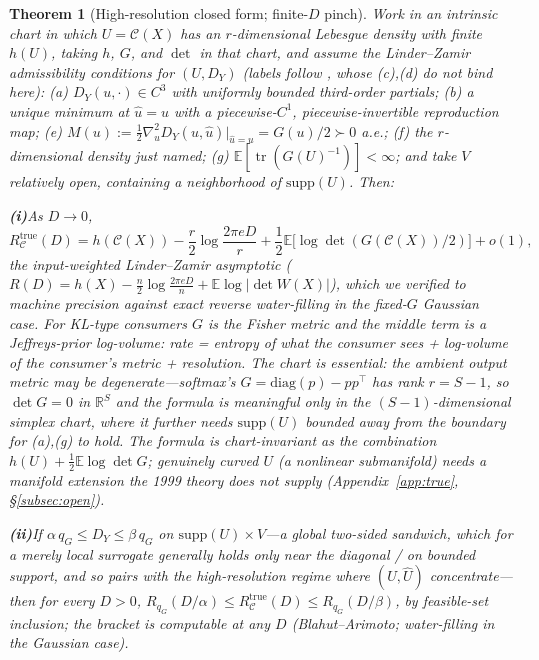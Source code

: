 \documentclass[lettersize,onecolumn]{IEEEtran}
\newtheorem{theorem}{Theorem}
\theoremstyle{definition}
\theoremstyle{remark}
\newcommand{\tr}{\operatorname{tr}}
\newcommand{\E}{\mathbb{E}}
\begin{document}
\begin{theorem}[High-resolution closed form; finite-$D$ pinch]\label{thm:B3}
Work in an intrinsic chart in which $U=\mathcal{C}(X)$ has an $r$-dimensional Lebesgue
density with finite $h(U)$, taking $h$, $G$, and $\det$ in that chart, and assume the
Linder--Zamir admissibility conditions \cite{linderzamir1999} for $(U,D_Y)$ (labels follow \cite{linderzamir1999}, whose (c),(d) do not bind here): \emph{(a)}
$D_Y(u,\cdot)\in C^3$ with uniformly bounded third-order partials; \emph{(b)} a unique
minimum at $\hat u=u$ with a piecewise-$C^1$, piecewise-invertible reproduction map;
\emph{(e)} $M(u):=\tfrac12\nabla^2_{\hat u}D_Y(u,\hat u)|_{\hat u=u}=G(u)/2\succ0$ a.e.;
\emph{(f)} the $r$-dimensional density just named; \emph{(g)}
$\E[\tr(G(U)^{-1})]<\infty$; and take $V$ relatively open, containing a neighborhood of
$\mathrm{supp}(U)$. Then:

\smallskip\noindent\textbf{(i)}\;As $D\to0$,
\[
R_{\mathcal{C}}^{\mathrm{true}}(D)=h(\mathcal{C}(X))-\frac r2\log\frac{2\pi eD}{r}
+\frac12\E\bigl[\log\det(G(\mathcal{C}(X))/2)\bigr]+o(1),
\]
the input-weighted Linder--Zamir asymptotic ($R(D)=h(X)-\tfrac n2\log\tfrac{2\pi
eD}{n}+\E\log|\det W(X)|$), which we verified to machine precision against exact reverse
water-filling in the fixed-$G$ Gaussian case. For KL-type consumers $G$ is the Fisher
metric and the middle term is a Jeffreys-prior log-volume: \emph{rate = entropy of
what the consumer sees + log-volume of the consumer's metric + resolution}. The
chart is essential: the ambient output metric may be degenerate---softmax's
$G=\mathrm{diag}(p)-pp^\top$ has rank $r=S-1$, so $\det G=0$ in $\mathbb{R}^S$ and the
formula is meaningful only in the $(S-1)$-dimensional simplex chart, where it further
needs $\mathrm{supp}(U)$ bounded away from the boundary for (a),(g) to hold. The formula
is chart-invariant as the combination $h(U)+\tfrac12\E\log\det G$; genuinely
\emph{curved} $U$ (a nonlinear submanifold) needs a manifold extension the 1999 theory
does not supply (Appendix~\ref{app:true}, \S\ref{subsec:open}).

\smallskip\noindent\textbf{(ii)}\;If $\alpha\,q_G\le D_Y\le\beta\,q_G$ on
$\mathrm{supp}(U)\times V$---a \emph{global} two-sided sandwich, which for a merely
local surrogate generally holds only near the diagonal / on bounded support, and so
pairs with the high-resolution regime where $(U,\hat U)$ concentrate---then for every
$D>0$, $R_{q_G}(D/\alpha)\le R_{\mathcal{C}}^{\mathrm{true}}(D)\le R_{q_G}(D/\beta)$, by
feasible-set inclusion; the bracket is computable at any $D$ (Blahut--Arimoto;
water-filling in the Gaussian case).
\end{theorem}
\end{document}
